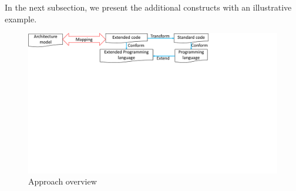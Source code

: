 In the next subsection, we present the additional constructs with an illustrative example.


\begin{figure}
	\centering
	\includegraphics[clip, trim=0cm 15cm 9.1cm 0cm, width=\columnwidth]{figures/mappingoverview.pdf}
	\caption{Approach overview} 
	\label{fig:mappingoverview}
\end{figure}



